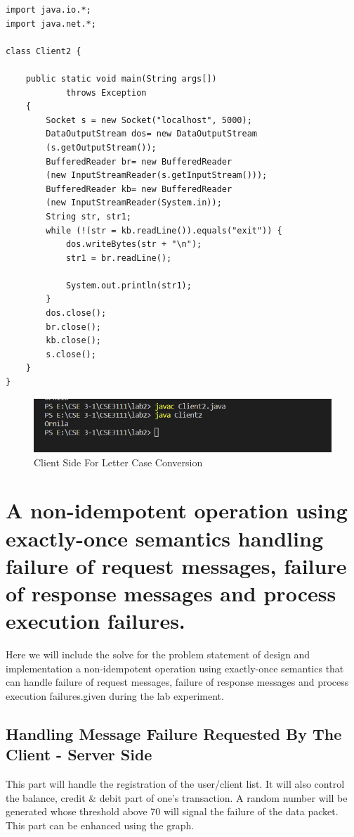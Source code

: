 \documentclass[11pt]{article}
\begin{document}
\begin{verbatim}
import java.io.*;
import java.net.*;

class Client2 {

    public static void main(String args[])
            throws Exception
    {
        Socket s = new Socket("localhost", 5000);
        DataOutputStream dos= new DataOutputStream
        (s.getOutputStream());
        BufferedReader br= new BufferedReader
        (new InputStreamReader(s.getInputStream()));
        BufferedReader kb= new BufferedReader
        (new InputStreamReader(System.in));
        String str, str1;
        while (!(str = kb.readLine()).equals("exit")) {
            dos.writeBytes(str + "\n");
            str1 = br.readLine();

            System.out.println(str1);
        }
        dos.close();
        br.close();
        kb.close();
        s.close();
    }
}
\end{verbatim}

\begin{figure}[!h]
\centering
\includegraphics[width=\textwidth]{case_client.png}
\caption{Client Side For Letter Case Conversion}
\end{figure}

\section{A non-idempotent operation using exactly-once semantics handling failure of request messages, failure of response messages and process execution failures.}
Here we will include the solve for the problem statement of design and implementation a non-idempotent operation using exactly-once semantics that can handle failure of request messages, failure of response messages and process execution failures.given during the lab experiment.
\subsection{Handling Message Failure  Requested By The Client - Server Side }
This part will handle the registration of the user/client list. It will also control the balance, credit & debit part of one's transaction. A random number will be generated whose threshold above 70 will signal the failure of the data packet. This part can be enhanced using the graph. 
\end{document}
